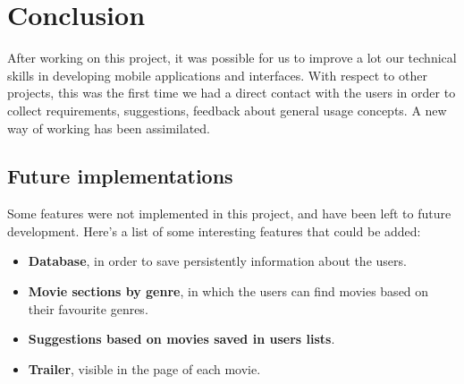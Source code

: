 \documentclass[12pt, a4paper]{article}
\numberwithin{figure}{section}
\begin{document}

\newpage

\section{Conclusion}

After working on this project, it was possible for us to improve a lot our technical skills
in developing mobile applications and interfaces. With respect to other projects, this was the
first time we had a direct contact with the users in order to collect requirements, suggestions,
feedback about general usage concepts. A new way of working has been assimilated.

\subsection{Future implementations}
Some features were not implemented in this project, and have been left to future development.
Here’s a list of some interesting features that could be added:
\begin{itemize}
	\item \textbf{Database}, in order to save persistently information about the users.
	\item \textbf{Movie sections by genre}, in which the users can find movies based on their favourite genres.
	\item \textbf{Suggestions based on movies saved in users lists}.
	\item \textbf{Trailer}, visible in the page of each movie.
\end{itemize}
\end{document}
